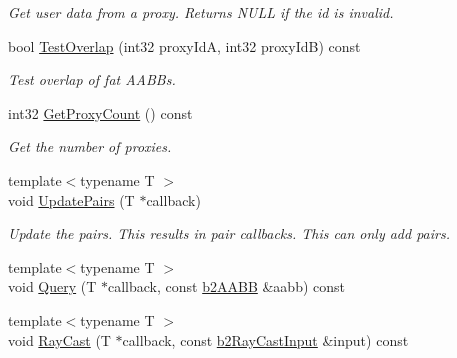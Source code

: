 \begin{DoxyCompactItemize}
\begin{DoxyCompactList}\small\item\em Get user data from a proxy. Returns N\+U\+LL if the id is invalid. \end{DoxyCompactList}\item 
\mbox{\label{classb2BroadPhase_a263cc21e2a3f1f892c20b048eca3cad6}} 
bool \hyperlink{classb2BroadPhase_a263cc21e2a3f1f892c20b048eca3cad6}{Test\+Overlap} (int32 proxy\+IdA, int32 proxy\+IdB) const
\begin{DoxyCompactList}\small\item\em Test overlap of fat A\+A\+B\+Bs. \end{DoxyCompactList}\item 
\mbox{\label{classb2BroadPhase_ab7a8c31223d8404b79f6c57e8fc69837}} 
int32 \hyperlink{classb2BroadPhase_ab7a8c31223d8404b79f6c57e8fc69837}{Get\+Proxy\+Count} () const
\begin{DoxyCompactList}\small\item\em Get the number of proxies. \end{DoxyCompactList}\item 
\mbox{\label{classb2BroadPhase_a0a1acd693466b997700242ae00784c20}} 
{\footnotesize template$<$typename T $>$ }\\void \hyperlink{classb2BroadPhase_a0a1acd693466b997700242ae00784c20}{Update\+Pairs} (T $\ast$callback)
\begin{DoxyCompactList}\small\item\em Update the pairs. This results in pair callbacks. This can only add pairs. \end{DoxyCompactList}\item 
{\footnotesize template$<$typename T $>$ }\\void \hyperlink{classb2BroadPhase_a187586ea98b9d16e5ef6e12fa31f8de2}{Query} (T $\ast$callback, const \hyperlink{structb2AABB}{b2\+A\+A\+BB} \&aabb) const
\item 
{\footnotesize template$<$typename T $>$ }\\void \hyperlink{classb2BroadPhase_ae65392ea91c7d0839ed5312f78b2837a}{Ray\+Cast} (T $\ast$callback, const \hyperlink{structb2RayCastInput}{b2\+Ray\+Cast\+Input} \&input) const
\item 
\mbox{\label{classb2BroadPhase_a868f95225d62c3ea79d231ed305253ea}} 

\end{DoxyCompactItemize}

